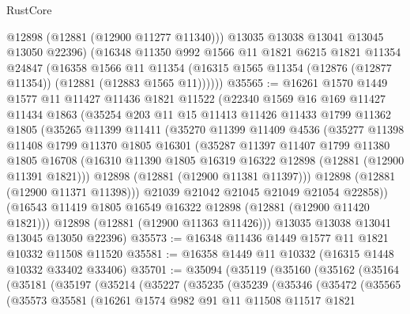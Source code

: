 \begin{lexlean}{RustCore}
\begin{coremodule}
          @12898
          (@12881 (@12900 @11277 @11340)))
        @13035
        @13038
        @13041
        @13045
        @13050
        @22396)
      (@16348
        @11350
        @992
        @1566
        @11
        @1821
        @6215
        @1821
        @11354
        @24847
        (@16358
          @1566
          @11
          @11354
          (@16315 @1565 @11354 (@12876 (@12877 @11354)) (@12881 (@12883 @1565 @11))))))
@35565 := @16261
    @1570
    @1449
    @1577
    @11
    @11427
    @11436
    @1821
    @11522
    (@22340
      @1569
      @16
      @169
      @11427
      @11434
      @1863
      (@35254
        @203
        @11
        @15
        @11413
        @11426
        @11433
        @1799
        @11362
        @1805
        (@35265
          @11399
          @11411
          (@35270
            @11399
            @11409
            @4536
            (@35277
              @11398
              @11408
              @1799
              @11370
              @1805
              @16301
              (@35287
                @11397
                @11407
                @1799
                @11380
                @1805
                @16708
                (@16310 @11390 @1805 @16319 @16322 @12898 (@12881 (@12900 @11391 @1821)))
                @12898
                (@12881 (@12900 @11381 @11397)))
              @12898
              (@12881 (@12900 @11371 @11398)))
            @21039
            @21042
            @21045
            @21049
            @21054
            @22858))
        (@16543 @11419 @1805 @16549 @16322 @12898 (@12881 (@12900 @11420 @1821)))
        @12898
        (@12881 (@12900 @11363 @11426)))
      @13035
      @13038
      @13041
      @13045
      @13050
      @22396)
@35573 := @16348 @11436 @1449 @1577 @11 @1821 @10332 @11508 @11520
@35581 := @16358 @1449 @11 @10332 (@16315 @1448 @10332 @33402 @33406)
@35701 := @35094
    (@35119
      (@35160
        (@35162
          (@35164
            (@35181
              (@35197
                (@35214
                  (@35227
                    (@35235
                      (@35239
                        (@35346
                          (@35472
                            (@35565
                              (@35573
                                @35581
                                (@16261
                                  @1574
                                  @982
                                  @91
                                  @11
                                  @11508
                                  @11517
                                  @1821

\end{coremodule}
\end{lexlean}
